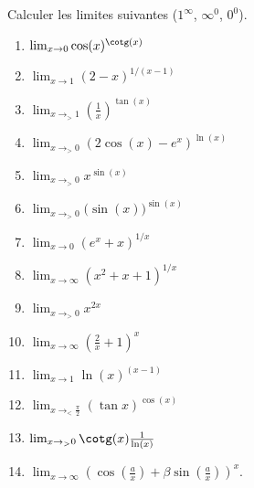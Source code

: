 \begin{exercice}\label{exo0011}

Calculer les limites suivantes ($1^{\infty}$, $\infty^0$, $0^0$).
\begin{multicols}{2}
	
\begin{enumerate}

\item
$\lim_{x\to 0} \cos(x)^{\cotg(x)}$

\item
$\lim_{x\to 1} (2-x)^{1/(x-1)}$

\item
$\lim_{x\to_{>}1 } \left( \frac{1}{ x } \right)^{\tan(x)}$

\item
$\lim_{x\to_{>} 0} (2\cos(x)-e^x)^{\ln(x)}$


\item
$\lim_{x\to_> 0} x^{\sin(x)}$


\item
$\lim_{x\to_> 0} \big( \sin(x) \big)^{\sin(x)}$


\item
$\lim_{x\to 0} ( e^{x}+x)^{1/x}$


\item
$\lim_{x\to\infty } (x^2+x+1)^{1/x}$


\item
$\lim_{x\to_>0} x^{2x}$


\item
$\lim_{x\to \infty} \left( \frac{ 2 }{ x }+1 \right)^{x}$


\item
$\lim_{x\to 1} \ln(x)^{(x-1)}$


\item
$\lim_{x\to_<\frac{ \pi }{ 2 } } (\tan x)^{\cos(x)}$


\item
$\lim_{x\to_>0 } \cotg(x)\frac{1}{ \ln(x) }$


\item
$\lim_{x\to \infty} \left( \cos(\frac{ a }{ x })+\beta\sin(\frac{ a }{ x }) \right)^x$.

\end{enumerate}


\end{multicols}


\end{exercice}
